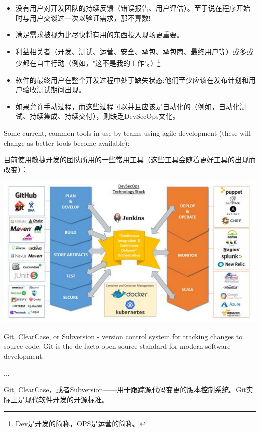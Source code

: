 \documentclass[UTF8, oneside]{ctexbook}
\begin{document}
\begin{paracol}{2}
\begin{rightcolumn}
\begin{itemize}
      \item 没有用户对开发团队的持续反馈（错误报告、用户评估）。至于说在程序开始时与用户交谈过一次以验证需求，那不算数!
      \item 满足需求被视为比尽快将有用的东西投入现场更重要。
      \item 利益相关者（开发、测试、运营、安全、承包、承包商、最终用户等）或多或少都在自主行动（例如，"这不是我的工作"。）\footnote*[2]{Dev是开发的简称，OPS是运营的简称。}
      \item 软件的最终用户在整个开发过程中处于缺失状态;他们至少应该在发布计划和用户验收测试期间出现。
      \item 如果允许手动过程，而这些过程可以并且应该是自动化的（例如，自动化测试、持续集成、持续交付），则缺乏DevSecOps文化。
    \end{itemize}
  \end{rightcolumn}

  \begin{leftcolumn*}
    Some current, common tools in use by teams using agile development (these will change as better tools become available):
  \end{leftcolumn*}
  \begin{rightcolumn}
    目前使用敏捷开发的团队所用的一些常用工具（这些工具会随着更好工具的出现而改变）：
  \end{rightcolumn}

  \begin{leftcolumn*}
    \includegraphics[width = .9\textwidth]{figure1.png}
  \end{leftcolumn*}

  \begin{leftcolumn*}
    Git, ClearCase, or Subversion - version control system for tracking changes to source code. Git is the de facto open source standard for modern software development.
    
    ...
  \end{leftcolumn*}
  \begin{rightcolumn}
    Git, ClearCase，或者Subversion——用于跟踪源代码变更的版本控制系统。Git实际上是现代软件开发的开源标准。


\end{rightcolumn}
\end{paracol}
\end{document}
